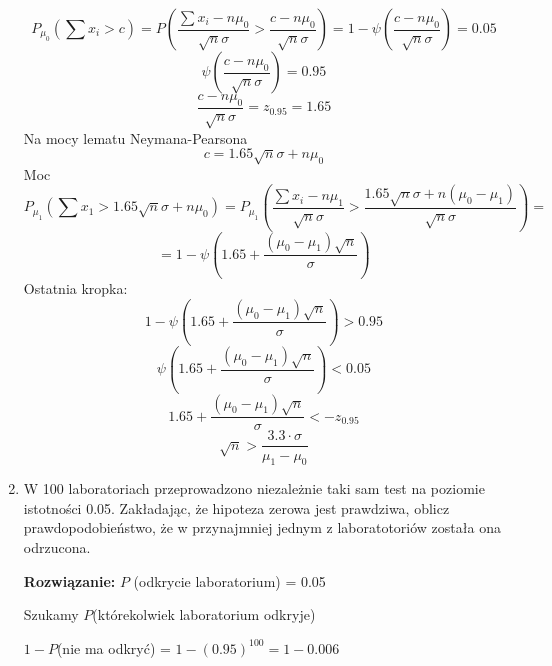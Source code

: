 \documentclass[11pt]{article}
\begin{document}
\begin{enumerate}
    \[P_{\mu_0}(\sum x_i > c) = P\left( \frac{\sum x_i - n\mu_0}{\sqrt{n}\sigma} >  \frac{c - n\mu_0}{\sqrt{n}\sigma} \right) = 1 - \psi \left( \frac{c - n \mu_0}{\sqrt{n} \sigma} \right) = 0.05\]
    \[\psi \left( \frac{c - n \mu_0}{\sqrt{n} \sigma} \right) = 0.95\]
    \[ \frac{c - n \mu_0}{\sqrt{n} \sigma}  = z_{0.95} = 1.65\]
    Na mocy lematu Neymana-Pearsona
    \[c = 1.65 \sqrt{n} \sigma + n \mu_0\]
    Moc 
    \[P_{\mu_1}(\sum x_1 > 1.65 \sqrt{n} \sigma + n \mu_0) = P_{\mu_1} \left( \frac{\sum x_i - n \mu_1}{\sqrt{n}\sigma} > \frac{1.65 \sqrt{n} \sigma + n (\mu_0-\mu_1)}{\sqrt{n}\sigma} \right) = \]
    \[= 1 - \psi\left(1.65 + \frac{(\mu_0 - \mu_1) \sqrt{n}}{\sigma} \right)\]
    Ostatnia kropka: 
    \[1 - \psi\left(1.65 + \frac{(\mu_0 - \mu_1) \sqrt{n}}{\sigma} \right) > 0.95\]
    \[\psi\left(1.65 + \frac{(\mu_0 - \mu_1) \sqrt{n}}{\sigma} \right) < 0.05\]
    \[1.65 + \frac{(\mu_0 - \mu_1) \sqrt{n}}{\sigma} < - z_{0.95}\]
    \[\sqrt{n}> \frac{3.3 \cdot  \sigma}{\mu_1 - \mu_0}\]
    \item W 100 laboratoriach przeprowadzono niezależnie taki sam test na poziomie istotności 0.05. Zakładając, że hipoteza zerowa jest prawdziwa, oblicz prawdopodobieństwo, że w przynajmniej jednym z laboratotoriów została ona odrzucona.
    \par 
    \textbf{Rozwiązanie: }
    \(P\) (odkrycie laboratorium) = 0.05
    \par
    Szukamy \(P\)(którekolwiek laboratorium odkryje)
    \par 
    \(1 - P\)(nie ma odkryć) = \(1 - (0.95)^{100} = 1 - 0.006\)
    

\end{enumerate}
\end{document}
